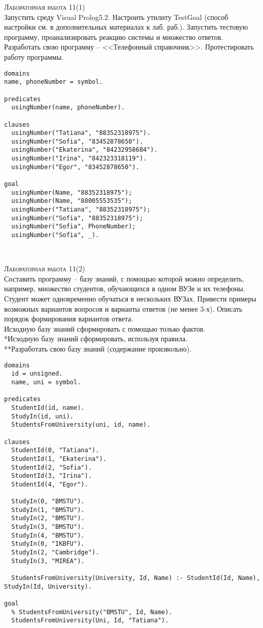 \textsc{\huge Лабораторная работа 11(1)} \\

Запустить среду Visual Prolog5.2. Настроить утилиту TestGoal (способ настройки см. в дополнительных материалах к лаб. раб.). Запустить тестовую программу, проанализировать реакцию системы и множество ответов. Разработать свою программу -- <<Телефонный справочник>>. Протестировать работу программы.

\begin{lstlisting}
domains
name, phoneNumber = symbol.

predicates
  usingNumber(name, phoneNumber).

clauses
  usingNumber("Tatiana", "88352318975").
  usingNumber("Sofia", "83452878650").
  usingNumber("Ekaterina", "84232958684").
  usingNumber("Irina", "842323318119").
  usingNumber("Egor", "83452878650").

goal
  usingNumber(Name, "88352318975");
  usingNumber(Name, "88005553535");
  usingNumber("Tatiana", "88352318975");
  usingNumber("Sofia", "88352318975");
  usingNumber("Sofia", PhoneNumber);
  usingNumber("Sofia", _).
\end{lstlisting}

~\newline

\textsc{\huge Лабораторная работа 11(2)} \\
Составить программу – базу знаний, с помощью которой можно определить, например, множество студентов, обучающихся в одном ВУЗе и их телефоны. Студент может одновременно обучаться в нескольких ВУЗах. Привести примеры возможных вариантов вопросов и варианты ответов (не менее 3-х). Описать порядок формирования вариантов
ответа. \\
Исходную базу знаний сформировать с помощью только фактов. \\
*Исходную базу знаний сформировать, используя правила. \\
**Разработать свою базу знаний (содержание произвольно).\\
\begin{lstlisting}
domains
  id = unsigned.
  name, uni = symbol.

predicates
  StudentId(id, name).
  StudyIn(id, uni).
  StudentsFromUniversity(uni, id, name).

clauses
  StudentId(0, "Tatiana").
  StudentId(1, "Ekaterina").
  StudentId(2, "Sofia").
  StudentId(3, "Irina").
  StudentId(4, "Egor").

  StudyIn(0, "BMSTU").
  StudyIn(1, "BMSTU").
  StudyIn(2, "BMSTU").
  StudyIn(3, "BMSTU").
  StudyIn(4, "BMSTU").
  StudyIn(0, "IKBFU").
  StudyIn(2, "Cambridge").
  StudyIn(3, "MIREA").

  StudentsFromUniversity(University, Id, Name) :- StudentId(Id, Name), StudyIn(Id, University).

goal
  % StudentsFromUniversity("BMSTU", Id, Name).
  StudentsFromUniversity(Uni, Id, "Tatiana").
\end{lstlisting}